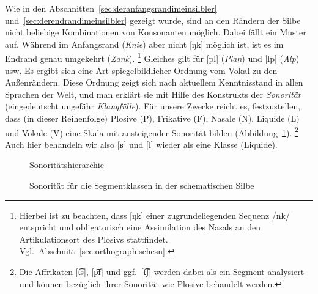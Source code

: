 Wie in den Abschnitten~\ref{sec:deranfangsrandimeinsilbler} und~\ref{sec:derendrandimeinsilbler} gezeigt wurde, sind an den Rändern der Silbe nicht beliebige Kombinationen von Konsonanten möglich.
Dabei fällt ein Muster auf.
Während im Anfangsrand \zB [kn] (\textit{Knie}) aber nicht [ŋk] möglich ist, ist es im Endrand genau umgekehrt (\textit{Zank}).%
\footnote{Hierbei ist zu beachten, dass [ŋk] einer zugrundeliegenden Sequenz /nk/ entspricht und obligatorisch eine Assimilation des Nasals an den Artikulationsort des Plosivs stattfindet. Vgl.\ Abschnitt~\ref{sec:orthographischesn}.}
Gleiches gilt für [pl] (\textit{Plan}) und [lp] (\textit{Alp}) usw.
Es ergibt sich eine Art spiegelbildlicher Ordnung vom Vokal zu den Außenrändern.
Diese Ordnung zeigt sich nach aktuellem Kenntnisstand in allen Sprachen der Welt, und man erklärt sie mit Hilfe des Konstrukts der \textit{Sonorität} (eingedeutscht ungefähr \textit{Klangfülle}).
Für unsere Zwecke reicht es, festzustellen, dass (in dieser Reihenfolge) Plosive (P), Frikative (F), Nasale (N), Liquide (L) und Vokale (V) eine Skala mit ansteigender Sonorität bilden (Abbildung~\ref{fig:sonoritaet085}).%
\footnote{Die Affrikaten [t͡s], [p͡f] und ggf.\ [t͡ʃ] werden dabei als ein Segment analysiert und können bezüglich ihrer Sonorität wie Plosive behandelt werden.}
Auch hier behandeln wir also [ʁ] und [l] wieder als eine Klasse (Liquide).


\begin{figure}[!htbp]
  \centering
  \caption{Sonoritätshierarchie}
  \label{fig:sonoritaet085}
\end{figure}

\begin{figure}[!htbp]
  \centering
  \caption{Sonorität für die Segmentklassen in der schematischen Silbe}
  \label{fig:sonoritaet086}
\end{figure}

